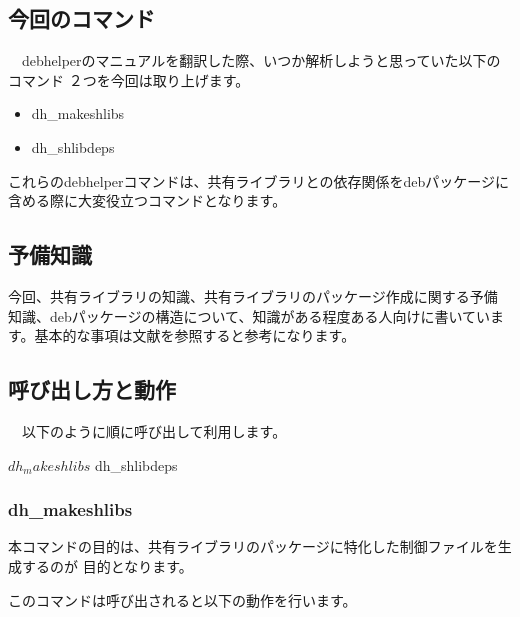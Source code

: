 \documentclass[mingoth,a4paper]{jsarticle}
\begin{document}
\subsection{今回のコマンド}

　debhelperのマニュアルを翻訳した際、いつか解析しようと思っていた以下のコマンド
２つを今回は取り上げます。

\begin{itemize}
\item dh\_makeshlibs
\item dh\_shlibdeps
\end{itemize}

 これらのdebhelperコマンドは、共有ライブラリとの依存関係をdebパッケージに
含める際に大変役立つコマンドとなります。

\subsection{予備知識}

 今回、共有ライブラリの知識、共有ライブラリのパッケージ作成に関する予備
知識、debパッケージの構造について、知識がある程度ある人向けに書いていま
す。基本的な事項は文献\cite{levine,sakai,satorutakabayashi,junichiuekawalibrary,man5deb}を参照すると参考になります。

\subsection{呼び出し方と動作}

　以下のように順に呼び出して利用します。

\begin{commandline}
$ dh_makeshlibs 
$ dh_shlibdeps
\end{commandline}

\subsubsection{dh\_makeshlibs}

 本コマンドの目的は、共有ライブラリのパッケージに特化した制御ファイルを生成するのが
目的となります。

このコマンドは呼び出されると以下の動作を行います。
\end{document}
